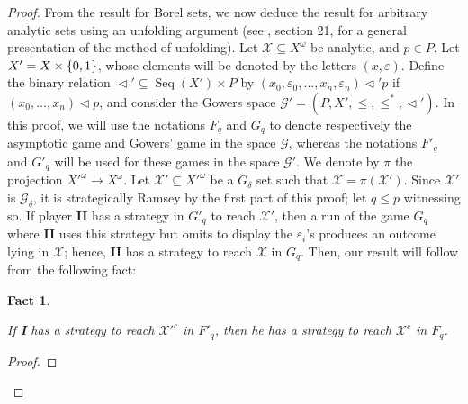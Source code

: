 \documentclass[a4paper,11pt]{article}
\newtheorem{fact}[thm]{Fact}
\theoremstyle{definition}
\numberwithin{equation}{section}
\newcommand{\X}{\mathcal{X}}
\newcommand{\G}{\mathcal{G}}
\newcommand{\I}{\textbf{I}}
\newcommand{\II}{\textbf{II}}
\DeclareMathOperator{\Seq}{Seq}
\begin{document}
\begin{proof}
From the result for Borel sets, we now deduce the result for arbitrary analytic sets using an unfolding argument (see \cite{kechris}, section 21, for a general presentation of the method of unfolding). Let $\X \subseteq X^\omega$ be analytic, and $p \in P$. Let $X' = X \times \nolinebreak \{0, 1\}$, whose elements will be denoted by the letters $(x, \varepsilon)$. Define the binary relation $\vartriangleleft' \subseteq \Seq(X') \times P$ by $(x_0, \varepsilon_0, \ldots, x_n, \varepsilon_n) \vartriangleleft' p$ if $(x_0, \ldots, x_n) \vartriangleleft p$, and consider the Gowers space $\G' = (P, X', \leqslant, \leqslant^*, \vartriangleleft')$. In this proof, we will use the notations $F_q$ and $G_q$ to denote respectively the asymptotic game and Gowers' game in the space $\G$, whereas the notations $F'_q$ and $G'_q$ will be used for these games in the space $\G'$. We denote by $\pi$ the projection $X'^\omega \longrightarrow X^\omega$. Let $\X' \subseteq X'^\omega$ be a $G_\delta$ set such that $\X = \pi(\X')$. Since $\X'$ is $\G_\delta$, it is strategically Ramsey by the first part of this proof; let $q \leqslant p$ witnessing so. If player \II{} has a strategy in $G'_q$ to reach $\X'$, then a run of the game $G_q$ where \II{} uses this strategy but omits to display the $\varepsilon_i$'s produces an outcome lying in $\X$; hence, \II{} has a strategy to reach $\X$ in $G_q$. Then, our result will follow from the following fact:

\begin{fact}\label{Fact34}

If \I{} has a strategy to reach $\X'^c$ in $F'_q$, then he has a strategy to reach $\X^c$ in $F_q$.

\end{fact}

\begin{proof}


\end{proof}
\end{proof}
\end{document}
